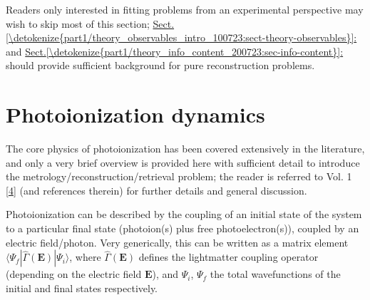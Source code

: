 \documentclass[letterpaper,table,10pt,english]{jupyterBook}
\begin{document}
\sphinxAtStartPar
Readers only interested in fitting problems from an experimental perspective may wish to skip most of this section; \hyperref[\detokenize{part1/theory_observables_intro_100723:sect-theory-observables}]{Sect.\@ \ref{\detokenize{part1/theory_observables_intro_100723:sect-theory-observables}}:} and \hyperref[\detokenize{part1/theory_info_content_200723:sec-info-content}]{Sect.\@ \ref{\detokenize{part1/theory_info_content_200723:sec-info-content}}:} should provide sufficient background for pure reconstruction problems.

\sphinxstepscope


\section{Photoionization dynamics}
\label{\detokenize{part1/theory_photoionization_dynamics_140723:photoionization-dynamics}}\label{\detokenize{part1/theory_photoionization_dynamics_140723:sec-dynamics-intro}}\label{\detokenize{part1/theory_photoionization_dynamics_140723::doc}}
\sphinxAtStartPar
The core physics of photoionization has been covered extensively in the literature, and only a very brief overview is provided here with sufficient detail to introduce the metrology/reconstruction/retrieval problem; the reader is referred to  Vol. 1 {[}\hyperlink{cite.backmatter/bibliography:id677}{4}{]} (and references therein) for further details and general discussion.

\sphinxAtStartPar
Photoionization can be described by the coupling of an initial state of the system to a particular final state (photoion(s) plus free photoelectron(s)), coupled by an electric field/photon. Very generically, this can be written as a matrix element \(\langle\Psi_f|\hat{\Gamma}(\boldsymbol{\mathbf{E}})|\Psi_i\rangle\), where \(\hat{\Gamma}(\boldsymbol{\mathbf{E}})\) defines the light\sphinxhyphen{}matter coupling operator (depending on the electric field \(\boldsymbol{\mathbf{E}}\)), and \(\Psi_i\), \(\Psi_f\) the total wavefunctions of the initial and final states respectively.
\end{document}
